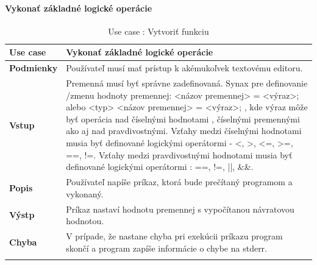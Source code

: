\paragraph{Vykonať základné logické operácie}
\begin{center}
	\begin{longtable}{|p{2.5cm}|p{14cm}|}
		
			\hline
			\textbf{Use case} & Vykonať základné logické operácie\\ 
			\hline
			\textbf{Podmienky} & Používateľ musí mať prístup k akémukoľvek textovému editoru.  \\ 
			\hline
			\textbf{Vstup} & Premenná musí byť správne zadefinovaná. \newline
			Synax pre definovanie /zmenu hodnoty premennej:  \newline
			<názov premennej> = <výraz>; alebo \newline
			<typ> <názov premennej> = <výraz>;
			\newline
			, kde výraz môže byť operácia nad číselnými hodnotami , číselnými premennými ako aj nad pravdivostnými.\newline
			Vzťahy medzi číselnými hodnotami musia byť definované logickými operátormi - <, >, <=, >=, ==, !=.\newline
			Vzťahy medzi pravdivostnými hodnotami musia byť definované logickými operátormi : ==, !=, ||, \&\&.  \\
			\hline
			\textbf{Popis} & Používateľ napíše príkaz, ktorá bude prečítaný programom a vykonaný.\\ 
			\hline
			\textbf{Výstp} & Príkaz nastaví hodnotu premennej s vypočítanou návratovou hodnotou.\\
			\hline
			\textbf{Chyba} & V prípade, že nastane chyba pri exekúcii príkazu program skončí a program zapíše informácie o chybe na stderr.\\
			\hline
		\caption{Use case : Vytvoriť funkciu}
		\label{table:1}
		
	\end{longtable}
\end{center}

